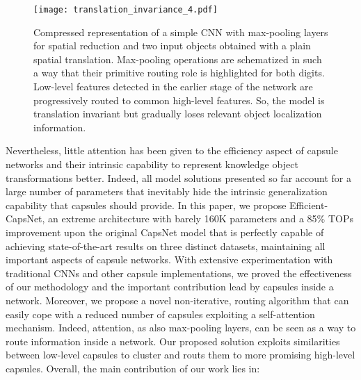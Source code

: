 \documentclass{article}
\begin{document}
\begin{figure}
    \centering
    \texttt{[image: translation\_invariance\_4.pdf]}
    \caption{Compressed representation of a simple CNN with max-pooling layers for spatial reduction and two input objects obtained with a plain spatial translation. Max-pooling operations are schematized in such a way that their primitive routing role is highlighted for both digits. Low-level features detected in the earlier stage of the network are progressively routed to common high-level features. So, the model is translation invariant but gradually loses relevant object localization information.}
    \label{fig:translation_invariance}
\end{figure}

Nevertheless, little attention has been given to the efficiency aspect of capsule networks and their intrinsic capability to represent knowledge object transformations better. Indeed, all model solutions presented so far account for a large number of parameters that inevitably hide the intrinsic generalization capability that capsules should provide. In this paper, we propose Efficient-CapsNet, an extreme architecture with barely 160K parameters and a 85\% TOPs improvement upon the original CapsNet model that is perfectly capable of achieving state-of-the-art results on three distinct datasets, maintaining all important aspects of capsule networks. With extensive experimentation with traditional CNNs and other capsule implementations, we proved the effectiveness of our methodology and the important contribution lead by capsules inside a network. Moreover, we propose a novel non-iterative, routing algorithm that can easily cope with a reduced number of capsules exploiting a self-attention mechanism. Indeed, attention, as also max-pooling layers, can be seen as a way to route information inside a network. Our proposed solution  exploits similarities between low-level capsules to cluster and routs them to more promising high-level capsules. Overall, the main contribution of our work lies in:
\end{document}

